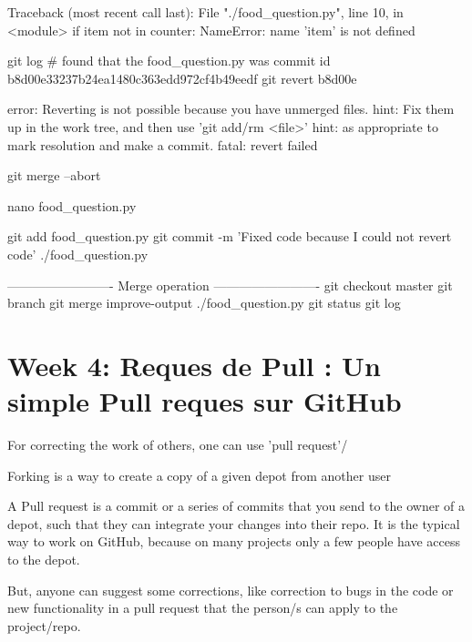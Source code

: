 \documentclass[11pt, onecolumn]{article}
\begin{document}
Traceback (most recent call last):
  File "./food_question.py", line 10, in <module>
    if item not in counter:
NameError: name 'item' is not defined

git log   # found that the food_question.py was commit id b8d00e33237b24ea1480c363edd972cf4b49eedf
git revert b8d00e

error: Reverting is not possible because you have unmerged files.
hint: Fix them up in the work tree, and then use 'git add/rm <file>'
hint: as appropriate to mark resolution and make a commit.
fatal: revert failed

git merge --abort

nano food_question.py

git add food_question.py
git commit -m 'Fixed code because I could not revert code'
./food_question.py

-------------------------
Merge operation
-------------------------
git checkout master
git branch
git merge improve-output
./food_question.py
git status
git log




\section{Week 4: Reques de Pull : Un simple Pull reques sur GitHub}

For correcting the work of others, one can use 'pull request'/

Forking is a way to create a copy of a given depot from another user

A Pull request is a commit or a series of commits that you send to the owner of a depot, such that they can integrate your changes into their repo. It is the typical way to work on GitHub, because on many projects only a few people have access to the depot.

But, anyone can suggest some corrections, like correction to bugs in the code or new functionality in a pull request that the person/s can apply to the project/repo.
\end{document}
